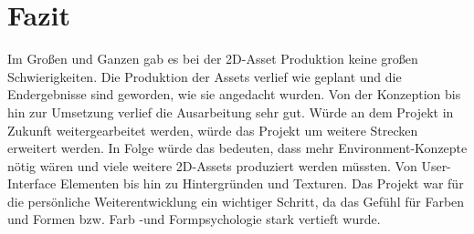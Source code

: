 \section{Fazit}
Im Großen und Ganzen gab es bei der 2D-Asset Produktion keine großen Schwierigkeiten. Die Produktion der Assets verlief wie geplant und die Endergebnisse sind geworden, wie sie angedacht wurden. Von der Konzeption bis hin zur Umsetzung verlief die Ausarbeitung sehr gut. 
Würde an dem Projekt in Zukunft weitergearbeitet werden, würde das Projekt um weitere Strecken erweitert werden. In Folge würde das bedeuten, dass mehr Environment-Konzepte nötig wären und viele weitere 2D-Assets produziert werden müssten. Von User-Interface Elementen bis hin zu Hintergründen und Texturen.
Das Projekt war für die persönliche Weiterentwicklung ein wichtiger Schritt, da das Gefühl für Farben und Formen bzw. Farb -und Formpsychologie stark vertieft wurde. 



